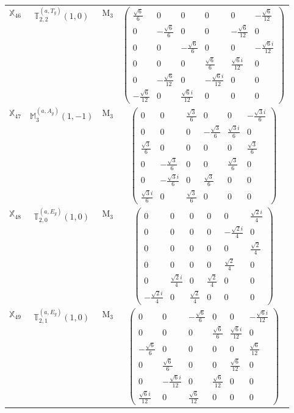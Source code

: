 \documentclass[fleqn,10pt,landscape]{article}
\begin{document}
\begin{itemize}
\begin{center}
\begin{longtable}{c|c|c|c}
$ \mathbb{X}_{46} $ & $\mathbb{T}_{2,2}^{(a,T_{g})}(1,0)$ & M$_{3}$ & $\begin{pmatrix} \frac{\sqrt{6}}{6} & 0 & 0 & 0 & 0 & - \frac{\sqrt{6}}{12} \\ 0 & - \frac{\sqrt{6}}{6} & 0 & 0 & - \frac{\sqrt{6}}{12} & 0 \\ 0 & 0 & - \frac{\sqrt{6}}{6} & 0 & 0 & - \frac{\sqrt{6} i}{12} \\ 0 & 0 & 0 & \frac{\sqrt{6}}{6} & \frac{\sqrt{6} i}{12} & 0 \\ 0 & - \frac{\sqrt{6}}{12} & 0 & - \frac{\sqrt{6} i}{12} & 0 & 0 \\ - \frac{\sqrt{6}}{12} & 0 & \frac{\sqrt{6} i}{12} & 0 & 0 & 0 \end{pmatrix}$ \\
$ \mathbb{X}_{47} $ & $\mathbb{M}_{3}^{(a,A_{g})}(1,-1)$ & M$_{3}$ & $\begin{pmatrix} 0 & 0 & \frac{\sqrt{3}}{6} & 0 & 0 & - \frac{\sqrt{3} i}{6} \\ 0 & 0 & 0 & - \frac{\sqrt{3}}{6} & \frac{\sqrt{3} i}{6} & 0 \\ \frac{\sqrt{3}}{6} & 0 & 0 & 0 & 0 & \frac{\sqrt{3}}{6} \\ 0 & - \frac{\sqrt{3}}{6} & 0 & 0 & \frac{\sqrt{3}}{6} & 0 \\ 0 & - \frac{\sqrt{3} i}{6} & 0 & \frac{\sqrt{3}}{6} & 0 & 0 \\ \frac{\sqrt{3} i}{6} & 0 & \frac{\sqrt{3}}{6} & 0 & 0 & 0 \end{pmatrix}$ \\
$ \mathbb{X}_{48} $ & $\mathbb{T}_{2,0}^{(a,E_{g})}(1,0)$ & M$_{3}$ & $\begin{pmatrix} 0 & 0 & 0 & 0 & 0 & \frac{\sqrt{2} i}{4} \\ 0 & 0 & 0 & 0 & - \frac{\sqrt{2} i}{4} & 0 \\ 0 & 0 & 0 & 0 & 0 & \frac{\sqrt{2}}{4} \\ 0 & 0 & 0 & 0 & \frac{\sqrt{2}}{4} & 0 \\ 0 & \frac{\sqrt{2} i}{4} & 0 & \frac{\sqrt{2}}{4} & 0 & 0 \\ - \frac{\sqrt{2} i}{4} & 0 & \frac{\sqrt{2}}{4} & 0 & 0 & 0 \end{pmatrix}$ \\
$ \mathbb{X}_{49} $ & $\mathbb{T}_{2,1}^{(a,E_{g})}(1,0)$ & M$_{3}$ & $\begin{pmatrix} 0 & 0 & - \frac{\sqrt{6}}{6} & 0 & 0 & - \frac{\sqrt{6} i}{12} \\ 0 & 0 & 0 & \frac{\sqrt{6}}{6} & \frac{\sqrt{6} i}{12} & 0 \\ - \frac{\sqrt{6}}{6} & 0 & 0 & 0 & 0 & \frac{\sqrt{6}}{12} \\ 0 & \frac{\sqrt{6}}{6} & 0 & 0 & \frac{\sqrt{6}}{12} & 0 \\ 0 & - \frac{\sqrt{6} i}{12} & 0 & \frac{\sqrt{6}}{12} & 0 & 0 \\ \frac{\sqrt{6} i}{12} & 0 & \frac{\sqrt{6}}{12} & 0 & 0 & 0 \end{pmatrix}$ \\ \hline

\end{longtable}
\end{center}
\end{itemize}
\end{document}
